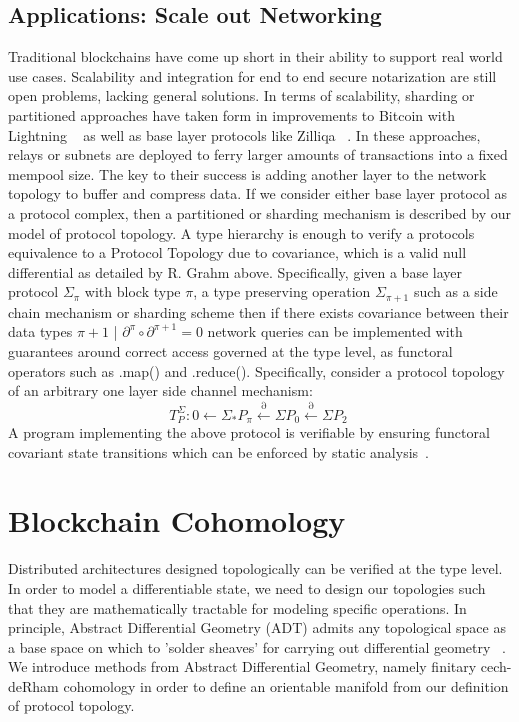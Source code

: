 \documentclass[runningheads]{llncs}
\begin{document}
\subsection{Applications: Scale out Networking}
Traditional blockchains have come up short in their ability to support real world use cases. Scalability and integration for end to end secure notarization are still open problems, lacking general solutions. In terms of scalability, sharding or partitioned approaches have taken form in improvements to Bitcoin with Lightning ~\cite{ref_url4} as well as base layer protocols like Zilliqa ~\cite{ref_url5}. In these approaches, relays or subnets are deployed to ferry larger amounts of transactions into a fixed mempool size. The key to their success is adding another layer to the network topology to buffer and compress data. If we consider either base layer protocol as a protocol complex, then a partitioned or sharding mechanism is described by our model of protocol topology. A type hierarchy is enough to verify a protocols equivalence to a Protocol Topology due to covariance, which is a valid null differential as detailed by R. Grahm above. Specifically, given a base layer protocol $\Sigma_\pi$ with block type $\pi$, a type preserving operation $\Sigma_{\pi+1}$ such as a side chain mechanism or sharding scheme then if there exists covariance between their data types $\pi+1$ | $\partial^\pi \circ \partial^{\pi+1} = 0$ network queries can be implemented with guarantees around correct access governed at the type level, as functoral operators such as .map() and .reduce(). Specifically, consider a protocol topology of an arbitrary one layer side channel mechanism:
\begin{equation}
T^{\Sigma}_P: 0 \leftarrow \Sigma_{*}P_\pi \xleftarrow{\partial} \Sigma P_{0} \xleftarrow{\partial} \Sigma P_2 \ 
\end{equation}
A program implementing the above protocol is verifiable by ensuring functoral covariant state transitions which can be enforced by static analysis~\cite{ref_article10}.

\section{Blockchain Cohomology}
Distributed architectures designed topologically can be verified at the type level. In order to model a differentiable state, we need to design our topologies such that they are mathematically tractable for modeling specific operations. In principle, Abstract Differential Geometry (ADT) admits any topological space as a base space on which to 'solder sheaves' for carrying out differential geometry ~\cite{ref_article6}. We introduce methods from Abstract Differential Geometry, namely finitary cech-deRham cohomology in order to define an orientable manifold from our definition of protocol topology.
\end{document}
